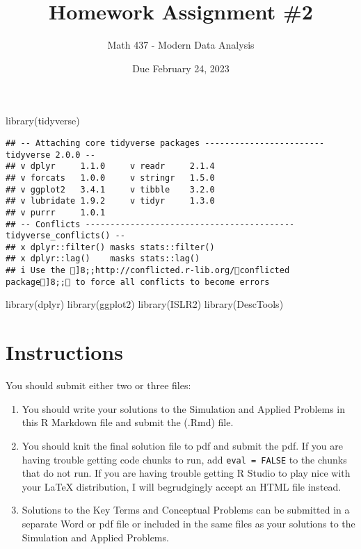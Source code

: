 \documentclass[
]{article}
\title{Homework Assignment \#2}
\author{Math 437 - Modern Data Analysis}
\date{Due February 24, 2023}
\newenvironment{Shaded}{\begin{snugshade}}{\end{snugshade}}
\newcommand{\FunctionTok}[1]{\textcolor[rgb]{0.00,0.00,0.00}{#1}}
\newcommand{\NormalTok}[1]{#1}
\providecommand{\tightlist}{%
  \setlength{\itemsep}{0pt}\setlength{\parskip}{0pt}}
\begin{document}
\maketitle

\begin{Shaded}
\begin{Highlighting}[]
\FunctionTok{library}\NormalTok{(tidyverse)}
\end{Highlighting}
\end{Shaded}

\begin{verbatim}
## -- Attaching core tidyverse packages ------------------------ tidyverse 2.0.0 --
## v dplyr     1.1.0     v readr     2.1.4
## v forcats   1.0.0     v stringr   1.5.0
## v ggplot2   3.4.1     v tibble    3.2.0
## v lubridate 1.9.2     v tidyr     1.3.0
## v purrr     1.0.1     
## -- Conflicts ------------------------------------------ tidyverse_conflicts() --
## x dplyr::filter() masks stats::filter()
## x dplyr::lag()    masks stats::lag()
## i Use the ]8;;http://conflicted.r-lib.org/conflicted package]8;; to force all conflicts to become errors
\end{verbatim}

\begin{Shaded}
\begin{Highlighting}[]
\FunctionTok{library}\NormalTok{(dplyr)}
\FunctionTok{library}\NormalTok{(ggplot2)}
\FunctionTok{library}\NormalTok{(ISLR2)}
\FunctionTok{library}\NormalTok{(DescTools)}
\end{Highlighting}
\end{Shaded}

\hypertarget{instructions}{%
\section{Instructions}\label{instructions}}

You should submit either two or three files:

\begin{enumerate}
\def\labelenumi{\arabic{enumi}.}
\tightlist
\item
  You should write your solutions to the Simulation and Applied Problems
  in this R Markdown file and submit the (.Rmd) file.
\item
  You should knit the final solution file to pdf and submit the pdf. If
  you are having trouble getting code chunks to run, add
  \texttt{eval\ =\ FALSE} to the chunks that do not run. If you are
  having trouble getting R Studio to play nice with your LaTeX
  distribution, I will begrudgingly accept an HTML file instead.
\item
  Solutions to the Key Terms and Conceptual Problems can be submitted in
  a separate Word or pdf file or included in the same files as your
  solutions to the Simulation and Applied Problems.
\end{enumerate}
\end{document}
